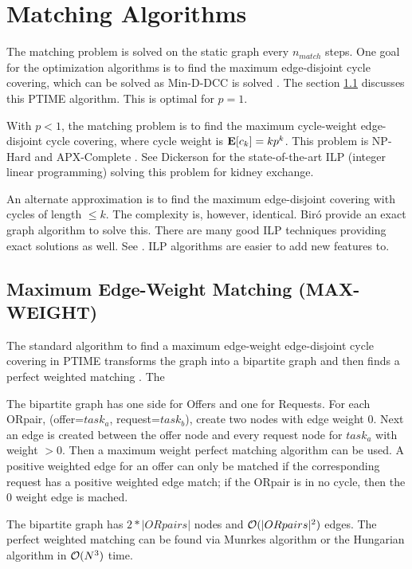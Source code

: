 \documentclass[main.tex]{subfiles}
\begin{document}
\section{Matching Algorithms} \label{sec:algorithms}
The matching problem is solved on the static graph every $n_{match}$ steps. One goal for the optimization algorithms is to find the maximum edge-disjoint cycle covering, which can be solved as Min-D-DCC is solved \cite{Man1} \cite{Bir}. The section \ref{bima} discusses this PTIME algorithm. This is optimal for $p=1$.

With $p<1$, the matching problem is to find the maximum cycle-weight edge-disjoint cycle covering, where cycle weight is $\mathbf{E}[c_k] = k p^k$. This problem is NP-Hard and APX-Complete \cite{Bir}. See Dickerson \cite{Dick} \cite{Dick3} for the state-of-the-art ILP (integer linear programming) solving this problem for kidney exchange.

An alternate approximation is to find the maximum edge-disjoint covering with cycles of length $\leq k$. The complexity is, however, identical. Bir\'{o} \cite{Bir} provide an exact graph algorithm to solve this. There are many good ILP techniques providing exact solutions as well. See \cite{And3} \cite{Glo1} \cite{Pla} \cite{Dick1}. ILP algorithms are easier to add new features to.

\subsection{Maximum Edge-Weight Matching (MAX-WEIGHT)}\label{bima}

The standard algorithm to find a maximum edge-weight edge-disjoint cycle covering in PTIME transforms the graph into a bipartite graph and then finds a perfect weighted matching \cite{Bir}. The

The bipartite graph has one side for Offers and one for Requests. For each ORpair, (offer=$task_a$, request=$task_b$), create two nodes with edge weight $0$. Next an edge is created between the offer node and every request node for $task_a$ with weight $> 0$. Then a maximum weight perfect matching algorithm can be used. A positive weighted edge for an offer can only be matched if the corresponding request has a positive weighted edge match; if the ORpair is in no cycle, then the $0$ weight edge is mached.

The bipartite graph has $2*|ORpairs|$ nodes and $\mathcal{O}(|ORpairs|^2)$ edges. The perfect weighted matching can be found via Munrkes algorithm or the Hungarian algorithm in $\mathcal{O}(N^3)$ time.
\end{document}
